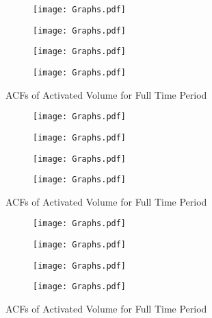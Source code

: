 \documentclass[12pt]{article}
\begin{document}
\begin{appendix}
\newpage
\begin{figure}
\centering
\begin{subfigure}{.5\textwidth}
  \centering
  \texttt{[image: Graphs.pdf]}
\end{subfigure}%
\begin{subfigure}{.5\textwidth}
  \centering
  \texttt{[image: Graphs.pdf]}
\end{subfigure}
\begin{subfigure}{.5\textwidth}
  \centering
  \texttt{[image: Graphs.pdf]}
\end{subfigure}%
\begin{subfigure}{.5\textwidth}
  \centering
  \texttt{[image: Graphs.pdf]}
\end{subfigure}
\caption{ACFs of Activated Volume for Full Time Period}
\label{figure:ACF2}
\end{figure}

\newpage
\begin{figure}
\centering
\begin{subfigure}{.5\textwidth}
  \centering
  \texttt{[image: Graphs.pdf]}
\end{subfigure}%
\begin{subfigure}{.5\textwidth}
  \centering
  \texttt{[image: Graphs.pdf]}
\end{subfigure}
\begin{subfigure}{.5\textwidth}
  \centering
  \texttt{[image: Graphs.pdf]}
\end{subfigure}%
\begin{subfigure}{.5\textwidth}
  \centering
  \texttt{[image: Graphs.pdf]}
\end{subfigure}
\caption{ACFs of Activated Volume for Full Time Period}
\label{figure:ACF3}
\end{figure}


\newpage
\begin{figure}
\centering
\begin{subfigure}{.5\textwidth}
  \centering
  \texttt{[image: Graphs.pdf]}
\end{subfigure}%
\begin{subfigure}{.5\textwidth}
  \centering
  \texttt{[image: Graphs.pdf]}
\end{subfigure}
\begin{subfigure}{.5\textwidth}
  \centering
  \texttt{[image: Graphs.pdf]}
\end{subfigure}%
\begin{subfigure}{.5\textwidth}
  \centering
  \texttt{[image: Graphs.pdf]}
\end{subfigure}
\caption{ACFs of Activated Volume for Full Time Period}
\label{figure:ACF4}
\end{figure}



\end{appendix}
\end{document}
